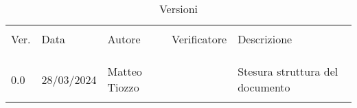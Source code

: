 \documentclass[italian,12pt]{article} %
\begin{document}


\newpage



\begin{table}[!h]
    \caption*{Versioni}
    \begin{center}
        \begin{tabular}{ l l l l p{9cm} }
            \hline                                                                                                          \\[-2ex]
            Ver. & Data       & Autore          & Verificatore              & Descrizione                                   \\
            \\[-2ex] \hline \\[-1.5ex]\\
            
            0.0  & 28/03/2024 & Matteo Tiozzo   &	                        & Stesura struttura del documento               \\
            \\[-1.5ex] \hline
        \end{tabular}
    \end{center}
\end{table}

\newpage

\tableofcontents

\newpage

\listoftables

\listoffigures

\newpage








\newpage
\newblock\newpage
\newblock\newpage
\newblock\newpage
\newblock\newpage
\newblock






\end{document}
